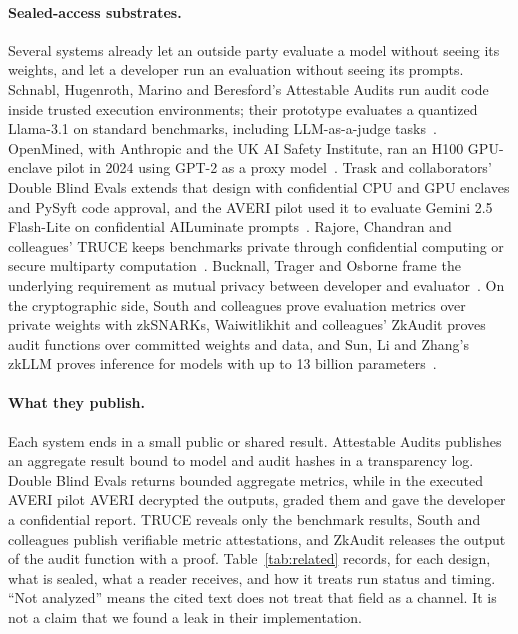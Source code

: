 \documentclass[10pt,twocolumn]{article}
\begin{document}
\paragraph{Sealed-access substrates.} Several systems already let an outside party evaluate a model without seeing its weights, and let a developer run an evaluation without seeing its prompts. Schnabl, Hugenroth, Marino and Beresford's Attestable Audits run audit code inside trusted execution environments; their prototype evaluates a quantized Llama-3.1 on standard benchmarks, including LLM-as-a-judge tasks~\cite{attestable}. OpenMined, with Anthropic and the UK AI Safety Institute, ran an H100 GPU-enclave pilot in 2024 using GPT-2 as a proxy model~\cite{openmined}. Trask and collaborators' Double Blind Evals extends that design with confidential CPU and GPU enclaves and PySyft code approval, and the AVERI pilot used it to evaluate Gemini 2.5 Flash-Lite on confidential AILuminate prompts~\cite{doubleblind,averi}. Rajore, Chandran and colleagues' TRUCE keeps benchmarks private through confidential computing or secure multiparty computation~\cite{truce}. Bucknall, Trager and Osborne frame the underlying requirement as mutual privacy between developer and evaluator~\cite{bucknall}. On the cryptographic side, South and colleagues prove evaluation metrics over private weights with zkSNARKs, Waiwitlikhit and colleagues' ZkAudit proves audit functions over committed weights and data, and Sun, Li and Zhang's zkLLM proves inference for models with up to 13 billion parameters~\cite{zkaudit,south,zkllm}.

\paragraph{What they publish.} Each system ends in a small public or shared result. Attestable Audits publishes an aggregate result bound to model and audit hashes in a transparency log. Double Blind Evals returns bounded aggregate metrics, while in the executed AVERI pilot AVERI decrypted the outputs, graded them and gave the developer a confidential report. TRUCE reveals only the benchmark results, South and colleagues publish verifiable metric attestations, and ZkAudit releases the output of the audit function with a proof. Table~\ref{tab:related} records, for each design, what is sealed, what a reader receives, and how it treats run status and timing. ``Not analyzed'' means the cited text does not treat that field as a channel. It is not a claim that we found a leak in their implementation.
\end{document}
